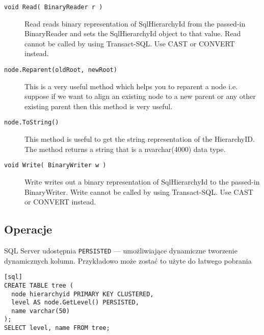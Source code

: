 \begin{description}
  \item[\texttt{void Read( BinaryReader r )}]
	Read reads binary representation of SqlHierarchyId from the passed-in BinaryReader and sets the SqlHierarchyId object to that value. 
	Read cannot be called by using Transact-SQL. Use CAST or CONVERT instead.

  \item[\texttt{node.Reparent(oldRoot, newRoot)}]
	This is a very useful method which helps you to reparent a node i.e. suppose if we want to align an existing node 
	to a new parent or any other existing parent then this method is very useful. 

  \item[\texttt{node.ToString()}]
	This method is useful to get the string representation of the HierarchyID. 
	The method returns a string that is a nvarchar(4000) data type.


  \item[\texttt{void Write( BinaryWriter w )}]
	Write writes out a binary representation of SqlHierarchyId to the passed-in BinaryWriter. 
	Write cannot be called by using Transact-SQL. Use CAST or CONVERT instead.

 \end{description}

\subsection*{Operacje}









SQL Server udostępnia \texttt{PERSISTED} --- umożliwiające dynamiczne tworzenie dynamicznych kolumn. 
Przykładowo może zostać to użyte do łatwego pobrania

\begin{verbatim}[sql]
CREATE TABLE tree (
  node hierarchyid PRIMARY KEY CLUSTERED,
  level AS node.GetLevel() PERSISTED,
  name varchar(50)
);
SELECT level, name FROM tree;
\end{verbatim}


